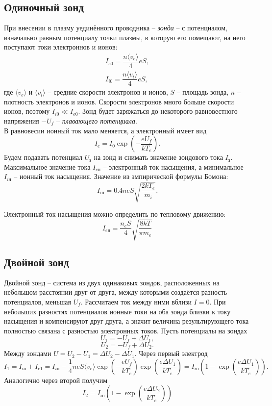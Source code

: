 \documentclass[a4paper, 12pt]{article}
\begin{document}
	\subsection*{Одиночный зонд}
	При внесении в плазму уединённого проводника -- \textit{зонда} -- с потенциалом, изначально равным потенциалу точки плазмы, в которую его помещают, на него поступают токи электроннов и ионов:
	\begin{equation}
		\begin{array}{c}
			I_{e0} = \dfrac{n \langle v_e \rangle}{4}eS,\\
			I_{i0} = \dfrac{n \langle v_i \rangle}{4}eS,
		\end{array}
	\end{equation}
	где $\langle v_e \rangle$ и $\langle v_i \rangle$ -- средние скорости электронов и ионов, $S$ -- площадь зонда, $n$ -- плотность электронов и ионов. Скорости электронов много больше скорости ионов, поэтому $I_{i0} \ll I_{e0}$. Зонд будет заряжаться до некоторого равновестного напряжения $-U_f$ -- \textit{плавающего потенциала}.\\
	В равновесии ионный ток мало меняется, а электронный имеет вид
	$$
	I_e = I_0 \exp\left( -\dfrac{eU_f}{kT_e} \right).
	$$
	Будем подавать потенциал $U_\text{з}$ на зонд и снимать значение зондового тока $I_\text{з}$. Максимальное значение тока $I_{e\text{н}}$ -- электронный ток насыщения, а минимальное $I_{i\text{н}}$ -- ионный ток насыщения. Значение из эмпирической формулы Бомона:
	\begin{equation}
		I_{i\text{н}} = 0.4 neS \sqrt{\dfrac{2kT_e}{m_i}}.
	\end{equation}
	
	Электронный ток насыщения можно определить по тепловому движению:
	\[I_{e\text{н}} = \frac{n_eS}{4}\sqrt{\frac{8kT}{\pi m_e}}\]
	\subsection*{Двойной зонд}
	Двойной зонд -- система из двух одинаковых зондов, расположенных на небольшом расстоянии друг от друга, между которыми создаётся разность потенциалов, меньшая $U_f$. Рассчитаем ток между ними вблизи $I=0$. При небольших разностях потенциалов ионные токи на оба зонда близки к току насыщения и компенсируют друг друга, а значит величина результирующего тока полностью связана с разностью электронных токов. Пусть потенциалы на зондах
	$$
	U_1 = -U_f + \Delta U_1,
	$$
	$$
	U_2 = -U_f + \Delta U_2.
	$$
	Между зондами $U = U_2 - U_1 = \Delta U_2 - \Delta U_1$.
	Через первый электрод
	\begin{equation}
		I_1 = I_{i\text{н}} + I_{e1} = I_{i\text{н}} - \dfrac{1}{4}neS\langle v_e\rangle \exp\left(-\dfrac{eU_f}{kT_e}\right)\exp\left(\dfrac{e\Delta U_1}{kT_e}\right)=I_{i\text{н}}\left(1 - \exp\left( \dfrac{e\Delta U_1}{kT_e} \right)\right).
	\end{equation}
	Аналогично через второй получим
	\begin{equation}
		I_2 = I_{i\text{н}}\left(1 - \exp\left( \dfrac{e\Delta U_2}{kT_e} \right)\right)
	\end{equation}
	
\end{document}

